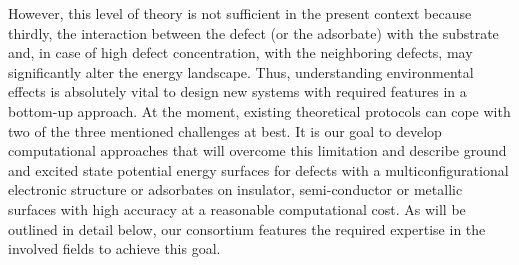 \documentclass[a4paper,11pt,headings=normal]{scrartcl}
\begin{document}
\begin{itemize}
However, this level of theory is not sufficient in the present context because 
thirdly, the interaction between the defect (or the adsorbate) with the substrate 
and, in case of high defect concentration, with the neighboring defects, may 
significantly alter the energy landscape.\autocite{Kuch2021, Ruben2021}  
Thus, understanding environmental 
effects is absolutely vital to design new systems with required features in a  
bottom-up approach. At the moment, existing theoretical protocols can cope with 
two of the three mentioned challenges at best. It is our goal to develop 
computational approaches that will overcome this limitation and describe ground 
and excited state potential energy surfaces for defects with a 
multiconfigurational electronic structure or 
adsorbates on insulator, semi-conductor or metallic surfaces with high accuracy 
at a reasonable computational cost. As will be outlined in detail below, our 
consortium features the required expertise in the involved fields to achieve 
this goal.\\


\end{itemize}
\end{document}

